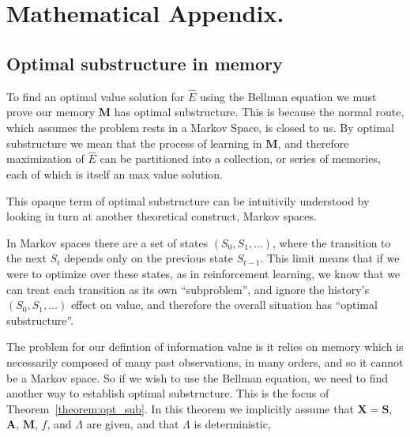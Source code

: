\section*{Mathematical Appendix.}
\newcommand{\beginsupplement}{%
        \setcounter{table}{0}
        \renewcommand{\thetable}{S\arabic{table}}%
        \setcounter{figure}{0}
        \renewcommand{\thefigure}{S\arabic{figure}}%
     }
\beginsupplement
\setcounter{theorem}{0}

\subsection*{Optimal substructure in memory}
To find an optimal value solution for $\hat E$ using the Bellman equation we must prove our memory $\mathbf{M}$ has optimal substructure. This is because the normal route, which assumes the problem rests in a Markov Space, is closed to us. By optimal substructure we mean that the process of learning in $\mathbf{M}$, and therefore maximization of $\hat E$ can be partitioned into a collection, or series of memories, each of which is itself an max value solution.

This opaque term of optimal substructure can be intuitivily understood by looking in turn at another theoretical construct, Markov spaces. 

In Markov spaces there are a set of states $(S_0, S_1, \ldots)$, where the transition to the next $S_t$ depends only on the previous state $S_{t-1}$. This limit means that if we were to optimize over these states, as in reinforcement learning, we know that we can treat each transition as its own ``subproblem'', and ignore the history's $(S_0, S_1, \ldots)$ effect on value, and therefore the overall situation has ``optimal substructure''.

The problem for our defintion of information value is it relies on memory which is necessarily composed of many past observations, in many orders, and so it cannot be a Markov space. So if we wish to use the Bellman equation, we need to find another way to establish optimal substructure. This is the focus of Theorem~\ref{theorem:opt_sub}. In this theorem we implicitly assume that $\mathbf{X} = \mathbf{S}$, $\mathbf{A}$, $\mathbf{M}$, $f$, and $\Lambda$ are given, and that $\Lambda$ is deterministic, 

